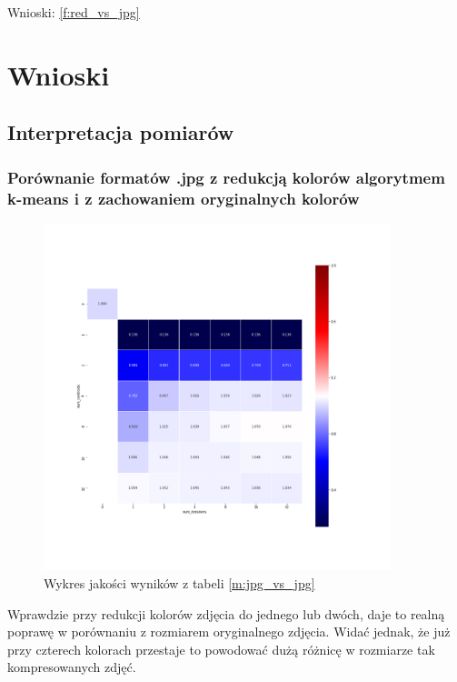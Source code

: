 \begin{figure}[H]
	
\end{figure}

Wnioski: \ref{f:red_vs_jpg}

\section{Wnioski}

\subsection{Interpretacja pomiarów}

\subsubsection{Porównanie formatów .jpg z redukcją kolorów algorytmem k-means i z zachowaniem oryginalnych kolorów}

\label{f:jpg_vs_jpg}

\begin{figure}[H]
	\includegraphics[width=0.9\textwidth]{photos/plots/jpg_vs_jpg}
    \caption{Wykres jakości wyników z tabeli \ref{m:jpg_vs_jpg}}
\end{figure}

Wprawdzie przy redukcji kolorów zdjęcia do jednego lub dwóch, daje to realną poprawę w porównaniu z rozmiarem oryginalnego zdjęcia. Widać jednak, że już przy czterech kolorach przestaje to powodować dużą różnicę w rozmiarze tak kompresowanych zdjęć.

